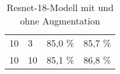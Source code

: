 \begin{table}[ht!]
\begin{tabular}{llll}
                                                      &                                                                                                        &                                                               &                                                                \\ \hline
\multicolumn{1}{|l|}{10}                              & \multicolumn{1}{l|}{3}                                                                                 & \multicolumn{1}{l|}{85,0 \%}                                  & \multicolumn{1}{l|}{85,7 \%}                                    \\ \hline
\multicolumn{1}{|l|}{10}                              & \multicolumn{1}{l|}{10}                                                                                & \multicolumn{1}{l|}{85,1 \%}                                  & \multicolumn{1}{l|}{86,8 \%}                                          \\ \hline
\end{tabular}
\caption{Resnet-18-Modell mit und ohne Augmentation}
\label{tab:r18_vergleichAA}
\end{table}